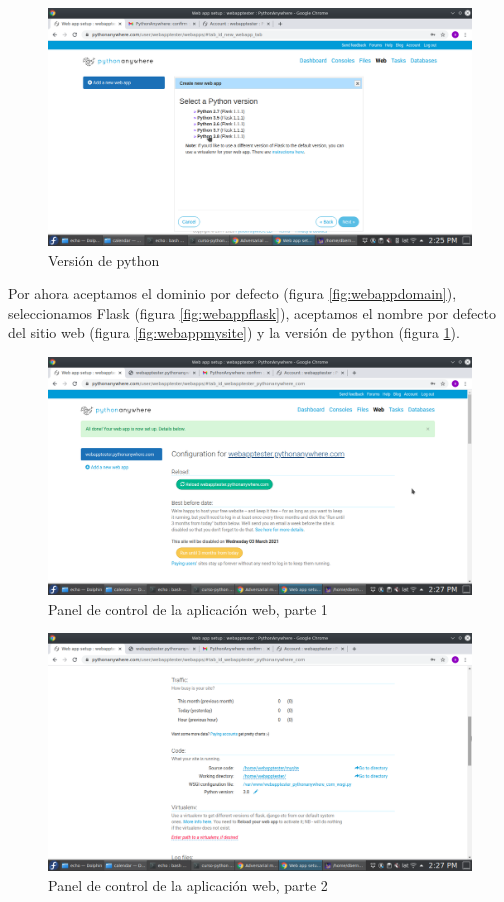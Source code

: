 \documentclass[10pt,a4paper]{article}
\begin{document}
\begin{figure}
	\centering
	\includegraphics[width=0.7\linewidth]{sc/webapp_python_3_8}
	\caption{Versión de python}
	\label{fig:webapppython38}
\end{figure}

Por ahora aceptamos el dominio por defecto (figura \ref{fig:webappdomain}), seleccionamos Flask (figura \ref{fig:webappflask}), aceptamos el nombre por defecto del sitio web (figura \ref{fig:webappmysite}) y la versión de python (figura \ref{fig:webapppython38}).


\begin{figure}
	\centering
	\includegraphics[width=0.7\linewidth]{sc/webapp_part_1}
	\caption{Panel de control de la aplicación web, parte 1}
	\label{fig:webapppart1}
\end{figure}

\begin{figure}
	\centering
	\includegraphics[width=0.7\linewidth]{sc/webapp_part_2}
	\caption{Panel de control de la aplicación web, parte 2}
	\label{fig:webapppart2}
\end{figure}
\end{document}
